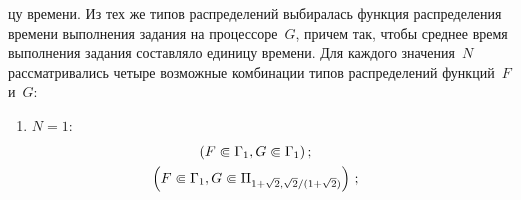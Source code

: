 \begin{multicols}{2}


\addtocounter{figure}{1}


\noindent
цу времени.  Из тех же типов распределений 
выбиралась функция распределения времени выполнения задания на процессоре~$G$, 
причем так, чтобы среднее время выполнения задания составляло единицу времени. Для 
каждого значения~$N$ рас\-смат\-ри\-ва\-лись четыре возможные комбинации типов 
распределений функций~$F$ и~$G$:
\begin{enumerate}[(1)]
\item $  N=1$:
\begin{gather*}
 \hspace*{-8mm}(F\Subset \Gamma_1, G\Subset \Gamma_1)\,;\\
 \hspace*{-8mm}\left( F\Subset \Gamma_1,G\Subset 
\Pi_{1+\sqrt{2},{\sqrt{2}}/({1+\sqrt{2}})}\right)\,;
\end{gather*}


\end{enumerate}
\end{multicols}
